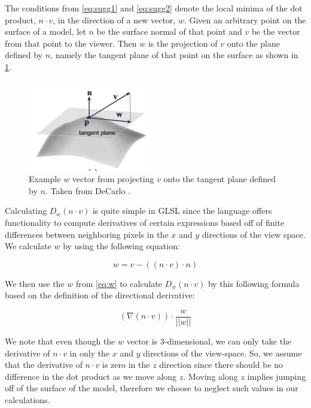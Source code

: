 \documentclass[10pt,twocolumn,letterpaper]{article}
\begin{document}
The conditions from \cref{eq:sugg1} and \cref{eq:sugg2} denote the local minima of the dot product, $n \cdot v$, in the direction of a new vector, $w$. Given an arbitrary point on the surface of a model, let $n$ be the surface normal of that point and $v$ be the vector from that point to the viewer. Then $w$ is the projection of $v$ onto the plane defined by $n$, namely the tangent plane of that point on the surface as shown in \cref{fig:tangentplane}.

\begin{figure}
    \centering
    \includegraphics[width=0.6\linewidth]{tangentplane.png}
    \caption{Example $w$ vector from projecting $v$ onto the tangent plane defined by $n$. Taken from DeCarlo \etal\cite{DeCarlo:2003:SCF}.}
    \label{fig:tangentplane}
\end{figure}

Calculating $D_w(n \cdot v)$ is quite simple in GLSL since the language offers functionality to compute derivatives of certain expressions based off of finite differences between neighboring pixels in the $x$ and $y$ directions of the view space. We calculate $w$ by using the following equation:

\begin{equation}
    w = v - ((n \cdot v) \cdot n)
    \label{eq:w}
\end{equation}

We then use the $w$ from \cref{eq:w} to calculate $D_w(n \cdot v)$ by this following formula based on the definition of the directional derivative:

\begin{equation}
    (\nabla (n \cdot v)) \cdot \frac{w}{||w||}
    \label{eq:first}
\end{equation}

We note that even though the $w$ vector is 3-dimensional, we can only take the derivative of $n \cdot v$ in only the $x$ and $y$ directions of the view-space. So, we assume that the derivative of $n \cdot v$ is zero in the $z$ direction since there should be no difference in the dot product as we move along $z$. Moving along $z$ implies jumping off of the surface of the model, therefore we choose to neglect such values in our calculations.
\end{document}
